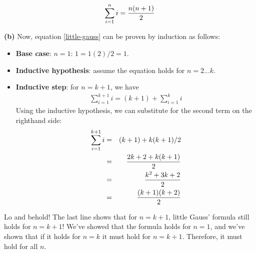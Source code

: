 \documentclass[11pt]{article}
\renewcommand{\part}[1] {\vspace{.10in} {\bf (#1)}}
\begin{document}
\begin{eqnarray}
\sum_{i=1}^n i = {{n(n+1)} \over 2}  %
\label{little-gauss}        %
\end{eqnarray}

\part{b} Now, equation \ref{little-gauss} can be proven by induction as
follows:

\begin{itemize}
\item {\bf Base case}: $n=1$: $1 = 1(2)/2=1$.
\item {\bf Inductive hypothesis}: assume the equation holds for $n=2...k$.
\item {\bf Inductive step}: for $n=k+1$, we have
\begin{eqnarray*}    %
\sum_{i=1}^{k+1} i = (k+1) + \sum_{i=1}^k i
\end{eqnarray*}
Using the inductive hypothesis, we can substitute for the second term
on the righthand side:
\begin{eqnarray*}
\sum_{i=1}^{k+1} i &=& (k+1) + k(k+1)/2\\    
                   &=& {{2k+2 + k(k+1)} \over 2}\\
                   &=& {{k^2 + 3k + 2} \over 2}\\
                   &=& {{(k+1)(k+2)} \over 2}
\end{eqnarray*}
\end{itemize}

Lo and behold! The last line shows that for $n=k+1$, little Gauss'
formula still holds for $n=k+1$! We've showed that the formula holds
for $n=1$, and we've shown that if it holds for $n=k$ it must hold for
$n=k+1$. Therefore, it must hold for all $n$.
\end{document}
